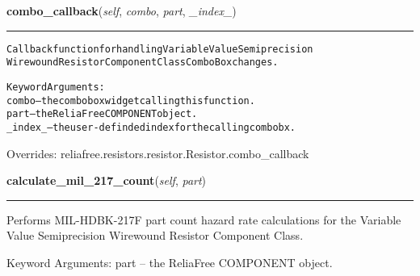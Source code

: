 \hspace{.8\funcindent}\begin{boxedminipage}{\funcwidth}

    \raggedright \textbf{combo\_callback}(\textit{self}, \textit{combo}, \textit{part}, \textit{\_index\_})

    \vspace{-1.5ex}

    \rule{\textwidth}{0.5\fboxrule}
\setlength{\parskip}{2ex}
\begin{alltt}
Callback function for handling Variable Value Semiprecision
Wirewound Resistor Component Class ComboBox changes.

Keyword Arguments:
  combo -- the combobox widget calling this function.
   part -- the ReliaFree COMPONENT object.
\_index\_ -- the user-definded index for the calling combobx.
\end{alltt}

\setlength{\parskip}{1ex}
      Overrides: reliafree.resistors.resistor.Resistor.combo\_callback

    \end{boxedminipage}

    \label{reliafree:resistors:variable:WirewoundSemiPrecision:calculate_mil_217_count}

    \vspace{0.5ex}

\hspace{.8\funcindent}\begin{boxedminipage}{\funcwidth}

    \raggedright \textbf{calculate\_mil\_217\_count}(\textit{self}, \textit{part})

    \vspace{-1.5ex}

    \rule{\textwidth}{0.5\fboxrule}
\setlength{\parskip}{2ex}
    Performs MIL-HDBK-217F part count hazard rate calculations for the 
    Variable Value Semiprecision Wirewound Resistor Component Class.

    Keyword Arguments: part -- the ReliaFree COMPONENT object.

\setlength{\parskip}{1ex}
    \end{boxedminipage}

